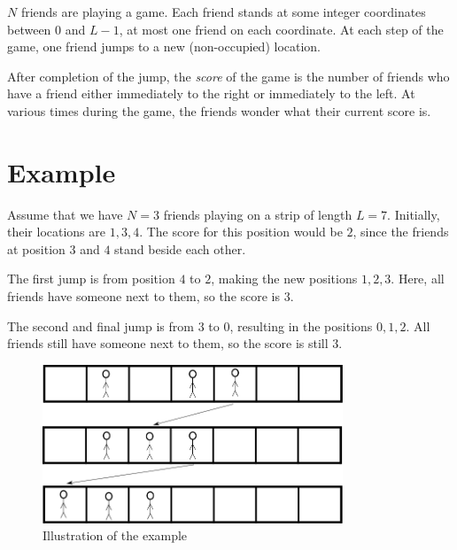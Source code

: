 \newcommand\version{v1}
$N$ friends are playing a game. Each friend stands at some integer coordinates between $0$ and $L - 1$, at most one friend on each
coordinate. At each step of the game, one friend jumps to a new (non-occupied) location.

After completion of the jump, the \emph{score} of the game is the number of friends who have a friend either
immediately to the right or immediately to the left. At various times during the game,
the friends wonder what their current score is.

\section*{Example}
Assume that we have $N = 3$ friends playing on a strip of length $L = 7$. Initially,
their locations are $1, 3, 4$. The score for this position would be $2$, since 
the friends at position $3$ and $4$ stand beside each other.

The first jump is from position $4$ to $2$, making the new positions $1, 2, 3$. Here, all friends
have someone next to them, so the score is $3$.

The second and final jump is from $3$ to $0$, resulting in the positions $0, 1, 2$. All friends
still have someone next to them, so the score is still $3$.

\begin{figure}[h!]
  \centering
  \includegraphics[width=0.8\textwidth]{sample.png}
  \caption{Illustration of the example}
\end{figure}

